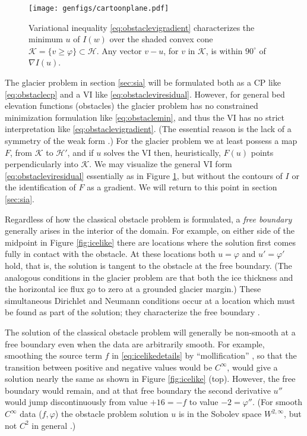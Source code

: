 \documentclass[letterpaper,final,12pt,reqno]{amsart}
\theoremstyle{claim}
\newcommand{\grad}{\nabla}
\numberwithin{equation}{section}
\numberwithin{figure}{section}
\numberwithin{table}{section}
\numberwithin{theorem}{section}
\begin{document}
\begin{figure}
\texttt{[image: genfigs/cartoonplane.pdf]}
\caption{Variational inequality \eqref{eq:obstaclevigradient} characterizes the minimum $u$ of $I(w)$ over the shaded convex cone $\mathcal{K}=\{v\ge \varphi\} \subset \mathcal{H}$.  Any vector $v-u$, for $v$ in $\mathcal{K}$, is within $90^\circ$ of $\grad I(u)$.}
\label{fig:cartoonplane}
\end{figure}

The glacier problem in section \ref{sec:sia} will be formulated both as a CP like \eqref{eq:obstaclecp} and a VI like \eqref{eq:obstacleviresidual}.  However, for general bed elevation functions (obstacles) the glacier problem has no constrained minimization formulation like \eqref{eq:obstaclemin}, and thus the VI has no strict interpretation like \eqref{eq:obstaclevigradient}.  (The essential reason is the lack of a symmetry of the weak form \cite{JouvetBueler2012}.)  For the glacier problem we at least possess a map $F$, from $\mathcal{K}$ to $\mathcal{H}'$, and if $u$ solves the VI then, heuristically, $F(u)$ points perpendicularly into $\mathcal{K}$.  We may visualize the general VI form \eqref{eq:obstacleviresidual} essentially as in Figure \ref{fig:cartoonplane}, but without the contours of $I$ or the identification of $F$ as a gradient.  We will return to this point in section \ref{sec:sia}.

Regardless of how the classical obstacle problem is formulated, a \emph{free boundary} generally arises in the interior of the domain.  For example, on either side of the midpoint in Figure \ref{fig:icelike} there are locations where the solution first comes fully in contact with the obstacle.  At these locations both $u=\varphi$ and $u'=\varphi'$ hold, that is, the solution is tangent to the obstacle at the free boundary.  (The analogous conditions in the glacier problem are that both the ice thickness and the horizontal ice flux go to zero at a grounded glacier margin.)  These simultaneous Dirichlet and Neumann conditions occur at a location which must be found as part of the solution; they characterize the free boundary \cite[Chapter V]{KinderlehrerStampacchia1980}.

The solution of the classical obstacle problem will generally be non-smooth at a free boundary even when the data are arbitrarily smooth.  For example, smoothing the source term $f$ in \eqref{eq:icelikedetails} by ``mollification'' \cite{Evans2010}, so that the transition between positive and negative values would be $C^\infty$, would give a solution nearly the same as shown in Figure \ref{fig:icelike} (top).  However, the free boundary would remain, and at that free boundary the second derivative $u''$ would jump discontinuously from value $+16=-f$ to value $-2=\varphi''$.  (For smooth $C^\infty$ data ($f,\varphi$) the obstacle problem solution $u$ is in the Sobolev space $W^{2,\infty}$, but not $C^2$ in general \cite[section IV.6]{KinderlehrerStampacchia1980}.)
\end{document}
